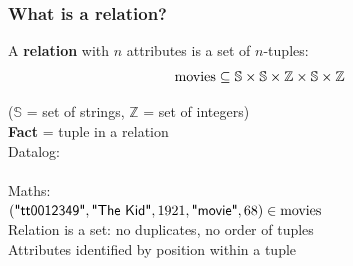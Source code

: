 \begin{frame}
    \label{s:relation-math}
    \frametitle{What is a relation?}
    A \textbf{relation} with $n$ attributes is a set of $n$-tuples:
    \[ \ra{movies} \subseteq \tikzmarknode{relA}{$\mathbb{S}$} \times \tikzmarknode{relB}{$\mathbb{S}$}
       \times \tikzmarknode{relC}{$\mathbb{Z}$} \times \tikzmarknode{relD}{$\mathbb{S}$}
       \times \tikzmarknode{relE}{$\mathbb{Z}$} \]
    \vspace{1em}

    ($\mathbb{S}$ = set of strings, $\mathbb{Z}$ = set of integers)\\[0.5em]\pause
    \textbf{Fact} = tuple in a relation\\[0.5em]
    Datalog:\\\hspace*{1em}
    {\footnotesize\ttfamily{}    }\\[0.5em]
    Maths:\\\hspace*{1em}
    $(\text{\textsf{"tt0012349"}}, \text{\textsf{"The Kid"}}, 1921, \text{\textsf{"movie"}}, 68) \in \mathrm{movies}$\\[1em]
    Relation is a set: no duplicates, no order of tuples\\[0.3em]
    Attributes identified by position within a tuple
\end{frame}
\label{l:relation-math}

